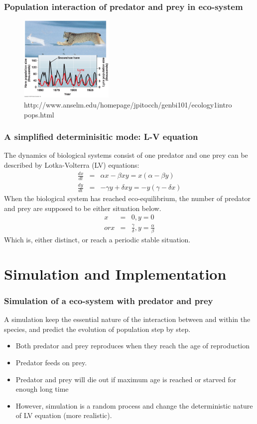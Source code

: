 \documentclass{beamer}
\begin{document}
\frame
{
 	\frametitle{Population interaction of predator and prey in eco-system}
 
	\begin{figure}[htbp]
	\begin{center}
		\includegraphics[width=0.4\textwidth]{./pics/predator_prey2.jpeg}
	\caption{http://www.anselm.edu/homepage/jpitocch/genbi101/ecology1intropops.html}
	\label{default}
	\end{center}
	\end{figure} 
}

\frame
{
 	\frametitle{A simplified determinisitic mode: L-V equation}
 	The dynamics of biological systems consist of one predator and one prey can be described by Lotka-Volterra (LV) equations:
 	\begin{eqnarray*}
 	\frac{dx}{dt} &=& \alpha x - \beta x y = x(\alpha - \beta y) \\
 	\frac{dy}{dt} &=& - \gamma y + \delta x y = - y (\gamma - \delta x)
 	\end{eqnarray*}
 	When the biological system has reached eco-equilibrium, the number of predator and prey are supposed to be either situation below.
 	\begin{eqnarray*}
 	x &=& 0, y = 0 \\
 	or x &=& \frac{\gamma}{\delta}, y = \frac{\alpha}{\beta}
 	\end{eqnarray*}
 	Which is, either distinct, or reach a periodic stable situation.
}

\section{Simulation and Implementation}
\frame
{
 	 \frametitle{Simulation of a eco-system with predator and prey}
  	A simulation keep the essential nature of the interaction between and within the species, and predict the 	evolution of population step by step.
  	\begin{itemize}
  	\item<1->{Both predator and prey reproduces when they reach the age of reproduction}
  	\item<2->{Predator feeds on prey.}
  	\item<3->{Predator and prey will die out if maximum age is reached or starved for enough long time}
  	\item<4->{However, simulation is a random process and change the deterministic nature of LV equation (more realistic).}
  	\end{itemize} 
}
\end{document}
